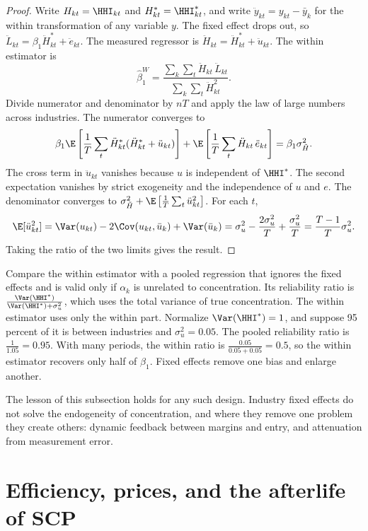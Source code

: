 \begin{proof}
Write $H_{kt} = \HHI_{kt}$ and $H^*_{kt} = \HHI^*_{kt}$, and write $\ddot y_{kt} = y_{kt} - \bar y_k$ for the
within transformation of any variable $y$. The fixed
effect drops out, so $\ddot L_{kt} = \beta_1 \ddot H^*_{kt} + \ddot e_{kt}$. The measured regressor
is $\ddot H_{kt} = \ddot H^*_{kt} + \ddot u_{kt}$. The within estimator is
\[
\hat\beta_1^W = \frac{\sum_k \sum_t \ddot H_{kt} \, \ddot L_{kt}}{\sum_k \sum_t \ddot H_{kt}^2}.
\]
Divide numerator and denominator by $nT$ and apply the law of large numbers across industries. The
numerator converges to
\[
\beta_1 \E\left[\frac{1}{T}\sum_t \ddot H^*_{kt} (\ddot H^*_{kt} + \ddot u_{kt})\right]
 + \E\left[\frac{1}{T}\sum_t \ddot H_{kt} \, \ddot e_{kt}\right] = \beta_1 \sigma^2_{\tilde H}.
\]
The cross term in $\ddot u_{kt}$ vanishes because $u$ is independent of $\HHI^*$. The second expectation
vanishes by strict exogeneity and the independence of $u$ and $e$. The denominator converges to
$\sigma^2_{\tilde H} + \E\left[\frac{1}{T}\sum_t \ddot u_{kt}^2\right]$. For each $t$,
\[
\E[\ddot u_{kt}^2] = \Var(u_{kt}) - 2 \Cov(u_{kt}, \bar u_k) + \Var(\bar u_k)
 = \sigma_u^2 - \frac{2\sigma_u^2}{T} + \frac{\sigma_u^2}{T} = \frac{T - 1}{T} \sigma_u^2 .
\]
Taking the ratio of the two limits gives the result.
\end{proof}

Compare the within estimator with a pooled regression that ignores the fixed effects and is valid only
if $\alpha_k$ is unrelated to concentration. Its reliability ratio is $\frac{\Var(\HHI^*)}{\Var(\HHI^*) +
\sigma_u^2}$, which uses the total variance of true concentration. The within estimator uses only the
within part. Normalize $\Var(\HHI^*) = 1$, and suppose 95 percent of it is between industries and
$\sigma_u^2 = 0.05$. The pooled reliability ratio is $\frac{1}{1.05} = 0.95$. With many periods, the
within ratio is $\frac{0.05}{0.05 + 0.05} = 0.5$, so the within estimator recovers only half of $\beta_1$.
Fixed effects remove one bias and enlarge another.

The lesson of this subsection holds for any such design. Industry fixed effects do not solve the
endogeneity of concentration, and where they remove one problem they create others: dynamic feedback
between margins and entry, and attenuation from measurement error.

\section{Efficiency, prices, and the afterlife of SCP}\label{sec:01-scp-after}

